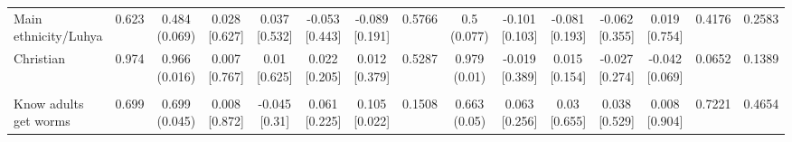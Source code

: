{\begin{tabular}[t]{lcccccccccccccc}
\hspace{1em}Main ethnicity/Luhya & 0.623 & \makecell[c]{0.484\\(0.069)} & \makecell[c]{0.028\\{[0.627]}} & \makecell[c]{0.037\\{[0.532]}} & \makecell[c]{-0.053\\{[0.443]}} & \makecell[c]{-0.089\\{[0.191]}} & 0.5766 & \makecell[c]{0.5\\(0.077)} & \makecell[c]{-0.101\\{[0.103]}} & \makecell[c]{-0.081\\{[0.193]}} & \makecell[c]{-0.062\\{[0.355]}} & \makecell[c]{0.019\\{[0.754]}} & 0.4176 & 0.2583\\
\hspace{1em}Christian & 0.974 & \makecell[c]{0.966\\(0.016)} & \makecell[c]{0.007\\{[0.767]}} & \makecell[c]{0.01\\{[0.625]}} & \makecell[c]{0.022\\{[0.205]}} & \makecell[c]{0.012\\{[0.379]}} & 0.5287 & \makecell[c]{0.979\\(0.01)} & \makecell[c]{-0.019\\{[0.389]}} & \makecell[c]{0.015\\{[0.154]}} & \makecell[c]{-0.027\\{[0.274]}} & \makecell[c]{-0.042\\{[0.069]}} & 0.0652 & 0.1389\\
\addlinespace[0.3em]
\hline
\multicolumn{15}{l}{\textit{\textbf{Panel B: Baseline sample - deworming knowledge, $N=1,995$}}}\\
\hline
\hspace{1em}Know adults get worms & 0.699 & \makecell[c]{0.699\\(0.045)} & \makecell[c]{0.008\\{[0.872]}} & \makecell[c]{-0.045\\{[0.31]}} & \makecell[c]{0.061\\{[0.225]}} & \makecell[c]{0.105\\{[0.022]}} & 0.1508 & \makecell[c]{0.663\\(0.05)} & \makecell[c]{0.063\\{[0.256]}} & \makecell[c]{0.03\\{[0.655]}} & \makecell[c]{0.038\\{[0.529]}} & \makecell[c]{0.008\\{[0.904]}} & 0.7221 & 0.4654\\

\end{tabular}}

